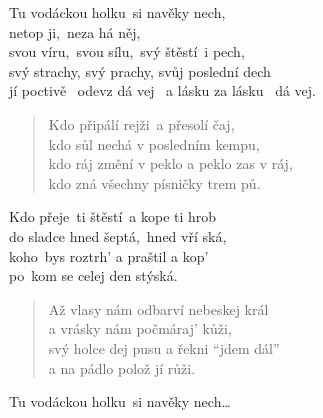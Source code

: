 \begin{song}{}
\begin{refren}
   Tu vodáckou holku~si navěky nech,  \\
   netop ji,~neza há něj,  \\
   svou víru,~svou sílu,~svý štěstí~i pech,  \\
   svý strachy, svý prachy, svůj poslední dech  \\
   jí poctivě ~odevz dá vej~ 
   a lásku za lásku ~dá vej. ~
\end{refren}
\begin{verse}
   Kdo připálí rejži~a přesolí čaj, \\
   kdo sůl nechá v posledním kempu, \\
   kdo ráj změní v peklo a peklo zas v ráj, \\
   kdo zná všechny písničky trem pů. ~
\end{verse}
\begin{deco}
   Kdo přeje~ti štěstí~a kope ti hrob \\
   do sladce hned šeptá,~hned vří ská,  \\
    koho~bys roztrh' a praštil a kop' \\
    po~kom se celej den stýská. 
\end{deco}
\begin{verse}
   Až vlasy nám odbarví nebeskej král \\
   a vrásky nám počmáraj' kůži,  \\
   svý holce dej pusu a řekni \enquote{jdem dál} \\
   a na pádlo polož jí růži.
\end{verse}
\begin{refren}
  Tu vodáckou holku~si navěky nech\ldots 
\end{refren}
\end{song}
\pagebreak
